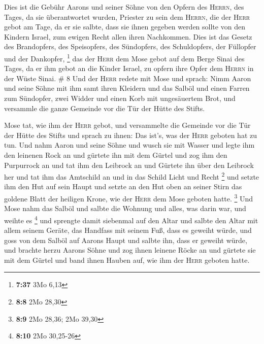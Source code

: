  Dies ist die Gebühr Aarons und seiner Söhne von den
Opfern des \textsc{Herrn}, des Tages, da sie überantwortet wurden,
Priester zu sein dem \textsc{Herrn},  die der
\textsc{Herr} gebot am Tage, da er sie salbte, dass sie ihnen gegeben
werden sollte von den Kindern Israel, zum ewigen Recht allen ihren
Nachkommen.  Dies ist das Gesetz des Brandopfers, des
Speisopfers, des Sündopfers, des Schuldopfers, der Füllopfer und der
Dankopfer, \footnote{\textbf{7:37} 3Mo 6,13}  das der
\textsc{Herr} dem Mose gebot auf dem Berge Sinai des Tages, da er ihm
gebot an die Kinder Israel, zu opfern ihre Opfer dem \textsc{Herrn} in
der Wüste Sinai. \# 8  Und der \textsc{Herr} redete mit
Mose und sprach:  Nimm Aaron und seine Söhne mit ihm samt
ihren Kleidern und das Salböl und einen Farren zum Sündopfer, zwei
Widder und einen Korb mit ungesäuertem Brot,  und
versammle die ganze Gemeinde vor die Tür der Hütte des Stifts.

 Mose tat, wie ihm der \textsc{Herr} gebot, und
versammelte die Gemeinde vor die Tür der Hütte des Stifts 
und sprach zu ihnen: Das ist's, was der \textsc{Herr} geboten hat zu
tun.  Und nahm Aaron und seine Söhne und wusch sie mit
Wasser  und legte ihm den leinenen Rock an und gürtete ihn
mit dem Gürtel und zog ihm den Purpurrock an und tat ihm den Leibrock an
und Gürtete ihn über den Leibrock her  und tat ihm das
Amtschild an und in das Schild Licht und Recht \footnote{\textbf{8:8}
  2Mo 28,30}  und setzte ihm den Hut auf sein Haupt und
setzte an den Hut oben an seiner Stirn das goldene Blatt der heiligen
Krone, wie der \textsc{Herr} dem Mose geboten hatte. \footnote{\textbf{8:9}
  2Mo 28,36; 2Mo 39,30}  Und Mose nahm das Salböl und
salbte die Wohnung und alles, was darin war, und weihte es \footnote{\textbf{8:10}
  2Mo 30,25-26}  und sprengte damit siebenmal auf den
Altar und salbte den Altar mit allem seinem Geräte, das Handfass mit
seinem Fuß, dass es geweiht würde,  und goss von dem
Salböl auf Aarons Haupt und salbte ihn, dass er geweiht würde,
 und brachte herzu Aarons Söhne und zog ihnen leinene
Röcke an und gürtete sie mit dem Gürtel und band ihnen Hauben auf, wie
ihm der \textsc{Herr} geboten hatte.

